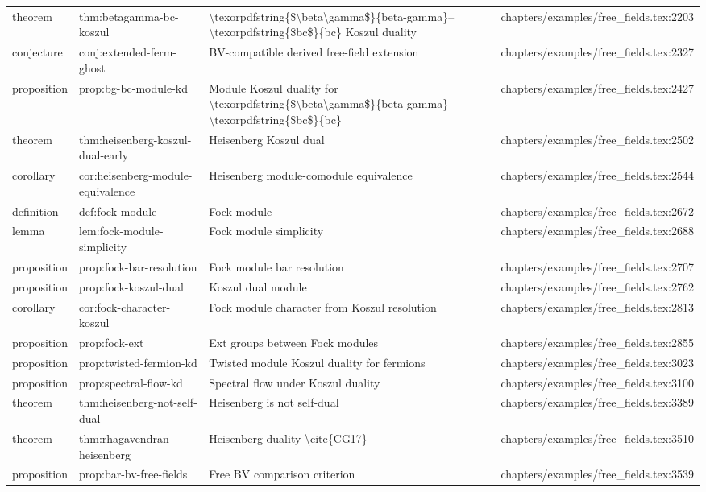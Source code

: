 \documentclass[11pt]{article}
\begin{document}
\begin{longtable}{L{0.10\textwidth}L{0.26\textwidth}L{0.42\textwidth}L{0.22\textwidth}}
theorem & thm:betagamma-bc-koszul & \textbackslash{}texorpdfstring\{\$\textbackslash{}beta\textbackslash{}gamma\$\}\{beta-gamma\}--\textbackslash{}texorpdfstring\{\$bc\$\}\{bc\} Koszul duality & chapters/examples/free\_fields.tex:2203\\
conjecture & conj:extended-ferm-ghost & BV-compatible derived free-field extension & chapters/examples/free\_fields.tex:2327\\
proposition & prop:bg-bc-module-kd & Module Koszul duality for \textbackslash{}texorpdfstring\{\$\textbackslash{}beta\textbackslash{}gamma\$\}\{beta-gamma\}--\textbackslash{}texorpdfstring\{\$bc\$\}\{bc\} & chapters/examples/free\_fields.tex:2427\\
theorem & thm:heisenberg-koszul-dual-early & Heisenberg Koszul dual & chapters/examples/free\_fields.tex:2502\\
corollary & cor:heisenberg-module-equivalence & Heisenberg module-comodule equivalence & chapters/examples/free\_fields.tex:2544\\
definition & def:fock-module & Fock module & chapters/examples/free\_fields.tex:2672\\
lemma & lem:fock-module-simplicity & Fock module simplicity & chapters/examples/free\_fields.tex:2688\\
proposition & prop:fock-bar-resolution & Fock module bar resolution & chapters/examples/free\_fields.tex:2707\\
proposition & prop:fock-koszul-dual & Koszul dual module & chapters/examples/free\_fields.tex:2762\\
corollary & cor:fock-character-koszul & Fock module character from Koszul resolution & chapters/examples/free\_fields.tex:2813\\
proposition & prop:fock-ext & Ext groups between Fock modules & chapters/examples/free\_fields.tex:2855\\
proposition & prop:twisted-fermion-kd & Twisted module Koszul duality for fermions & chapters/examples/free\_fields.tex:3023\\
proposition & prop:spectral-flow-kd & Spectral flow under Koszul duality & chapters/examples/free\_fields.tex:3100\\
theorem & thm:heisenberg-not-self-dual & Heisenberg is not self-dual & chapters/examples/free\_fields.tex:3389\\
theorem & thm:rhagavendran-heisenberg & Heisenberg duality \textbackslash{}cite\{CG17\} & chapters/examples/free\_fields.tex:3510\\
proposition & prop:bar-bv-free-fields & Free BV comparison criterion & chapters/examples/free\_fields.tex:3539\\

\end{longtable}
\end{document}
